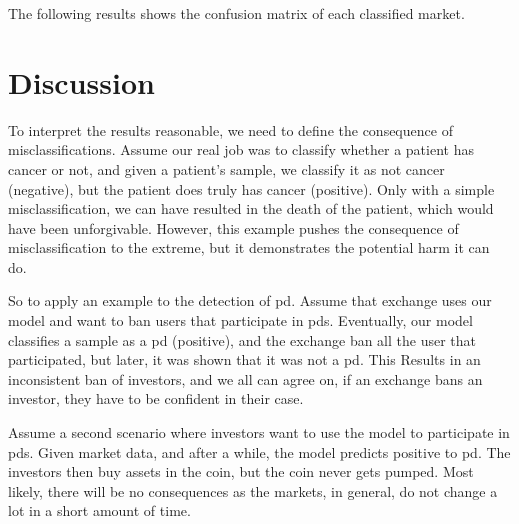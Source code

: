 The following results shows the confusion matrix of each classified market.



\newpage
\section{Discussion}
To interpret the results reasonable, we need to define the consequence of misclassifications. Assume our real job was to classify whether a patient has cancer or not, and given a patient's sample,  we classify it as not cancer (negative), but the patient does truly has cancer (positive). Only with a simple misclassification, we can have resulted in the death of the patient, which would have been unforgivable. However, this example pushes the consequence of misclassification to the extreme, but it demonstrates the potential harm it can do.

So to apply an example to the detection of \ac{pd}. Assume that exchange uses our model and want to ban users that participate in \acp{pd}. Eventually, our model classifies a sample as a \ac{pd} (positive), and the exchange ban all the user that participated, but later, it was shown that it was not a \ac{pd}. This Results in an inconsistent ban of investors, and we all can agree on, if an exchange bans an investor, they have to be confident in their case.

Assume a second scenario where investors want to use the model to participate in \acp{pd}. Given market data, and after a while, the model predicts positive to \ac{pd}. The investors then buy assets in the coin, but the coin never gets pumped. Most likely, there will be no consequences as the markets, in general, do not change a lot in a short amount of time.



